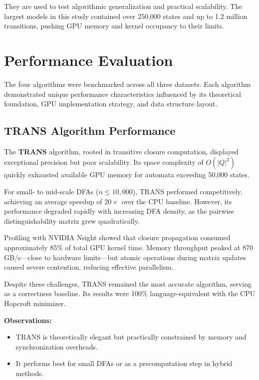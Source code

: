 They are used to test algorithmic generalization and practical scalability. The largest models in this study contained over 250,000 states and up to 1.2 million transitions, pushing GPU memory and kernel occupancy to their limits.

\section{Performance Evaluation}

The four algorithms were benchmarked across all three datasets. Each algorithm demonstrated unique performance characteristics influenced by its theoretical foundation, GPU implementation strategy, and data structure layout.

\subsection{TRANS Algorithm Performance}

The \textbf{TRANS} algorithm, rooted in transitive closure computation, displayed exceptional precision but poor scalability. Its space complexity of $O(|Q|^2)$ quickly exhausted available GPU memory for automata exceeding 50,000 states. 

For small- to mid-scale DFAs ($n \leq 10,000$), TRANS performed competitively, achieving an average speedup of $20\times$ over the CPU baseline. However, its performance degraded rapidly with increasing DFA density, as the pairwise distinguishability matrix grew quadratically.

Profiling with NVIDIA Nsight showed that closure propagation consumed approximately 85\% of total GPU kernel time. Memory throughput peaked at 870 GB/s—close to hardware limits—but atomic operations during matrix updates caused severe contention, reducing effective parallelism.

Despite these challenges, TRANS remained the most accurate algorithm, serving as a correctness baseline. Its results were 100\% language-equivalent with the CPU Hopcroft minimizer.

\textbf{Observations:}
\begin{itemize}
    \item TRANS is theoretically elegant but practically constrained by memory and synchronization overheads.
    \item It performs best for small DFAs or as a precomputation step in hybrid methods.
\end{itemize}

